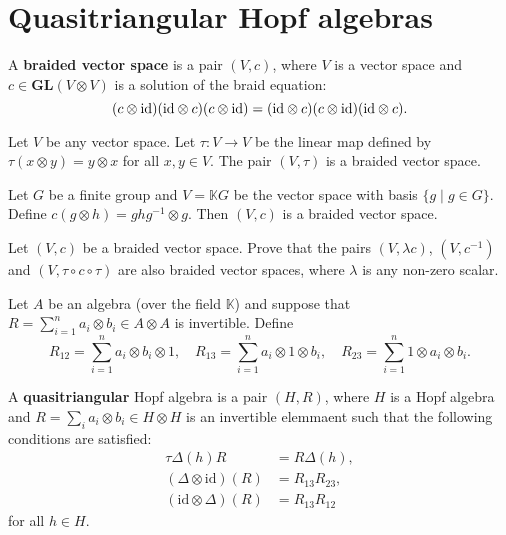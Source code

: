 \section{Quasitriangular Hopf algebras}


\begin{definition}
A \textbf{braided vector space} is a pair $\left(V,c\right)$, where
$V$ is a vector space and $c\in\mathbf{GL}(V\otimes V)$ is a solution
of the braid equation:
\[
(c\otimes\mathrm{id})(\mathrm{id}\otimes c)(c\otimes\mathrm{id})=(\mathrm{id}\otimes c)(c\otimes\mathrm{id})(\mathrm{id}\otimes c).
\]
\end{definition}

\begin{example}
Let $V$ be any vector space. Let $\tau:V\to V$ be the linear map
defined by $\tau(x\otimes y)=y\otimes x$ for all $x,y\in V$. The
pair $(V,\tau)$ is a braided vector space. 
\end{example}

\begin{example}
Let $G$ be a finite group and $V=\mathbb{K}G$ be the vector space
with basis $\{g\mid g\in G\}$. Define $c(g\otimes h)=ghg^{-1}\otimes g$.
Then $(V,c)$ is a braided vector space.
\end{example}

\begin{exercise}
Let $(V,c)$ be a braided vector space. Prove that the pairs $(V,\lambda c)$,
$(V,c^{-1})$ and $(V,\tau\circ c\circ\tau)$ are also braided vector
spaces, where $\lambda$ is any non-zero scalar.
\end{exercise}


Let $A$ be an algebra (over the field $\mathbb{K}$) and suppose
that $R=\sum_{i=1}^{n}a_{i}\otimes b_{i}\in A\otimes A$ is invertible.
Define 
\[
R_{12}=\sum_{i=1}^{n}a_{i}\otimes b_{i}\otimes1,\quad R_{13}=\sum_{i=1}^{n}a_{i}\otimes1\otimes b_{i},\quad R_{23}=\sum_{i=1}^{n}1\otimes a_{i}\otimes b_{i}.
\]

\begin{definition}
A \textbf{quasitriangular} Hopf algebra is a pair $(H,R)$, where
$H$ is a Hopf algebra and $R=\sum_{i}a_{i}\otimes b_{i}\in H\otimes H$
is an invertible elemmaent such that the following conditions are satisfied:
\begin{align}
\tau\Delta(h)R & =R\Delta(h),\label{QT:1}\\
(\Delta\otimes\textrm{id})(R) & =R_{13}R_{23},\label{QT:2}\\
(\textrm{id}\otimes\Delta)(R) & =R_{13}R_{12}\label{QT:3}
\end{align}
for all $h\in H$.
\end{definition}

